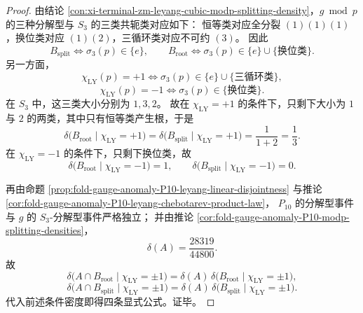 \begin{proof}
由结论 \ref{con:xi-terminal-zm-leyang-cubic-modp-splitting-density}，\(g\bmod p\) 的三种分解型与 \(S_3\) 的三类共轭类对应如下：
恒等类对应全分裂 \((1)(1)(1)\)，换位类对应 \((1)(2)\)，三循环类对应不可约 \((3)\)。
因此
\[
B_{\mathrm{split}} \Longleftrightarrow \sigma_3(p)\in \{e\},
\qquad
B_{\mathrm{root}} \Longleftrightarrow \sigma_3(p)\in \{e\}\cup \{\text{换位类}\}.
\]
另一方面，
\[
\chi_{\mathrm{LY}}(p)=+1
\Longleftrightarrow
\sigma_3(p)\in \{e\}\cup\{\text{三循环类}\},
\]
\[
\chi_{\mathrm{LY}}(p)=-1
\Longleftrightarrow
\sigma_3(p)\in \{\text{换位类}\}.
\]
在 \(S_3\) 中，这三类大小分别为 \(1,3,2\)。
故在 \(\chi_{\mathrm{LY}}=+1\) 的条件下，只剩下大小为 \(1\) 与 \(2\) 的两类，其中只有恒等类产生根，于是
\[
\delta\!\bigl(B_{\mathrm{root}}\mid \chi_{\mathrm{LY}}=+1\bigr)
=
\delta\!\bigl(B_{\mathrm{split}}\mid \chi_{\mathrm{LY}}=+1\bigr)
=
\frac{1}{1+2}
=
\frac13.
\]
在 \(\chi_{\mathrm{LY}}=-1\) 的条件下，只剩下换位类，故
\[
\delta\!\bigl(B_{\mathrm{root}}\mid \chi_{\mathrm{LY}}=-1\bigr)=1,
\qquad
\delta\!\bigl(B_{\mathrm{split}}\mid \chi_{\mathrm{LY}}=-1\bigr)=0.
\]

再由命题 \ref{prop:fold-gauge-anomaly-P10-leyang-linear-disjointness} 与推论
\ref{cor:fold-gauge-anomaly-P10-leyang-chebotarev-product-law}，
\(P_{10}\) 的分解型事件与 \(g\) 的 \(S_3\)-分解型事件严格独立；
并由推论 \ref{cor:fold-gauge-anomaly-P10-modp-splitting-densities}，
\[
\delta(A)=\frac{28319}{44800}.
\]
故
\[
\delta\!\bigl(A\cap B_{\mathrm{root}}\mid \chi_{\mathrm{LY}}=\pm1\bigr)
=
\delta(A)\,
\delta\!\bigl(B_{\mathrm{root}}\mid \chi_{\mathrm{LY}}=\pm1\bigr),
\]
\[
\delta\!\bigl(A\cap B_{\mathrm{split}}\mid \chi_{\mathrm{LY}}=\pm1\bigr)
=
\delta(A)\,
\delta\!\bigl(B_{\mathrm{split}}\mid \chi_{\mathrm{LY}}=\pm1\bigr).
\]
代入前述条件密度即得四条显式公式。证毕。
\end{proof}

